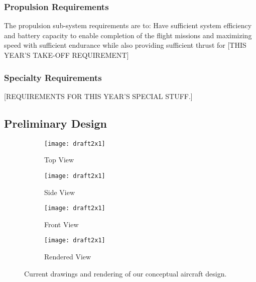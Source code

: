 \subsubsection{Propulsion Requirements}
\label{sssec:PropulsionReqs}

The propulsion sub-system requirements are to: Have sufficient system efficiency and battery capacity to enable completion of the flight missions and maximizing speed with sufficient endurance while also providing sufficient thrust for {\color{BYUred}[THIS YEAR'S TAKE-OFF REQUIREMENT]}

\subsubsection{Specialty Requirements} %
\label{sssec:SpecialReqs}

{\color{BYUred}[REQUIREMENTS FOR THIS YEAR'S SPECIAL STUFF.]} 
\lipsum[2]



\subsection{Preliminary Design}
\label{ssec:PreliminaryDesign}

\begin{figure}[h!]
	\centering
	\begin{subfigure}[b]{0.475\textwidth}
		\texttt{[image: draft2x1]}
		\caption{Top View}
		\label{fig:topview}
	\end{subfigure}
	\begin{subfigure}[b]{0.475\textwidth}
		\texttt{[image: draft2x1]}
		\caption{Side View}
		\label{fig:sideview}
	\end{subfigure}

	\begin{subfigure}[b]{0.475\textwidth}
		\texttt{[image: draft2x1]}
		\caption{Front View}
		\label{fig:frontview}
	\end{subfigure}
	\begin{subfigure}[b]{0.475\textwidth}
		\texttt{[image: draft2x1]}
		\caption{Rendered View}
		\label{fig:renderedview}
	\end{subfigure}
	\caption{Current drawings and rendering of our conceptual aircraft design.}
	\label{fig:prelimdrawings}
\end{figure}

